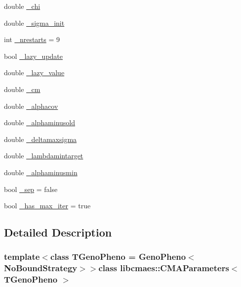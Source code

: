 \begin{DoxyCompactItemize}
\item 
double \hyperlink{classlibcmaes_1_1CMAParameters_ab63f8f5d707242ec981945df88a573db}{\-\_\-chi}
\item 
double \hyperlink{classlibcmaes_1_1CMAParameters_a8ad9eb52bd8ffcfc4ea175fef21c8f96}{\-\_\-sigma\-\_\-init}
\item 
int \hyperlink{classlibcmaes_1_1CMAParameters_a2ccf2865600fe20d965af9bdf9c6ab60}{\-\_\-nrestarts} = 9
\item 
bool \hyperlink{classlibcmaes_1_1CMAParameters_ac65bf2bb1b20461cfe8bd58175727ccc}{\-\_\-lazy\-\_\-update}
\item 
double \hyperlink{classlibcmaes_1_1CMAParameters_ae00e6b49bd99e1aa316bec03da96e95b}{\-\_\-lazy\-\_\-value}
\item 
double \hyperlink{classlibcmaes_1_1CMAParameters_a34e3414332daf15d81b353c7de803e1d}{\-\_\-cm}
\item 
double \hyperlink{classlibcmaes_1_1CMAParameters_ae13b411e5035c574e1521afa4b6d734b}{\-\_\-alphacov}
\item 
double \hyperlink{classlibcmaes_1_1CMAParameters_a3dfb7a180cb3746a4bc3a2d82b8a8f35}{\-\_\-alphaminusold}
\item 
double \hyperlink{classlibcmaes_1_1CMAParameters_a011a9f790bc21c6bea155066a26f5181}{\-\_\-deltamaxsigma}
\item 
double \hyperlink{classlibcmaes_1_1CMAParameters_afc8800d362e2b25074610b883684156b}{\-\_\-lambdamintarget}
\item 
double \hyperlink{classlibcmaes_1_1CMAParameters_a8d4e4afdbdb72635241846562fc37a04}{\-\_\-alphaminusmin}
\item 
bool \hyperlink{classlibcmaes_1_1CMAParameters_ad7f26f864149ce4d62169e15daa530fa}{\-\_\-sep} = false
\item 
bool \hyperlink{classlibcmaes_1_1CMAParameters_a9a66e6d8cf1e1c67cd9c43d5c87a71d1}{\-\_\-has\-\_\-max\-\_\-iter} = true
\end{DoxyCompactItemize}


\subsection{Detailed Description}
\subsubsection*{template$<$class T\-Geno\-Pheno = Geno\-Pheno$<$\-No\-Bound\-Strategy$>$$>$class libcmaes\-::\-C\-M\-A\-Parameters$<$ T\-Geno\-Pheno $>$}

